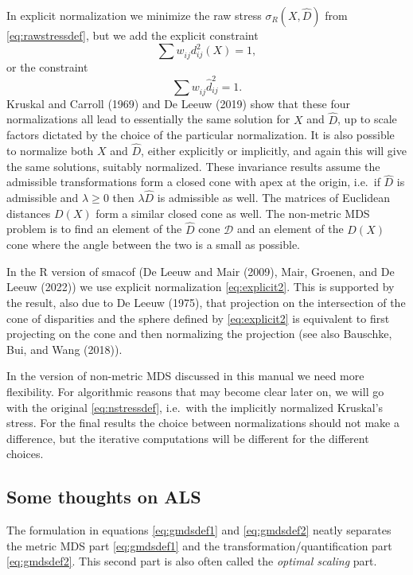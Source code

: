\documentclass[
  12pt,
]{article}
\begin{document}
In explicit normalization we minimize the raw stress \(\sigma_R(X,\hat D)\)
from \eqref{eq:rawstressdef}, but we add the explicit constraint
\begin{equation}
\sum   w_{ij}^{\ }d_{ij}^2(X)=1,
\label{eq:explicit1}
\end{equation}
or the constraint
\begin{equation}
\sum   w_{ij}^{\ }\hat d_{ij}^2=1.
\label{eq:explicit2}
\end{equation}
Kruskal and Carroll (1969) and De Leeuw (2019) show that these
four normalizations all lead to essentially the same solution for \(X\)
and \(\hat D\), up to scale factors dictated by the choice of the particular
normalization. It is also possible to normalize both \(X\) and \(\hat D\),
either explicitly or implicitly, and again this will give the same
solutions, suitably normalized. These invariance results assume the
admissible transformations form a closed cone with apex at the origin,
i.e.~if \(\hat D\) is admissible and \(\lambda\geq 0\) then \(\lambda\hat D\)
is admissible as well. The matrices of Euclidean distances \(D(X)\) form a
similar closed cone as well. The non-metric MDS problem is to find an element
of the \(\hat D\) cone \(\mathcal{D}\) and an element of the \(D(X)\) cone where the angle between the two is a small as possible.

In the R version of smacof (De Leeuw and Mair (2009),
Mair, Groenen, and De Leeuw (2022)) we use explicit normalization
\eqref{eq:explicit2}. This is supported by the result, also due to
De Leeuw (1975), that projection on the intersection of the cone of
disparities and the sphere defined by \eqref{eq:explicit2} is equivalent
to first projecting on the cone and then normalizing the projection (see
also Bauschke, Bui, and Wang (2018)).

In the version of non-metric MDS discussed in this manual we need more flexibility. For algorithmic reasons that may become clear later on, we will go with the original \eqref{eq:nstressdef}, i.e.~with the implicitly normalized
Kruskal's stress. For the final results the choice between normalizations should not make a difference, but the iterative computations will be different for the
different choices.

\subsection{Some thoughts on ALS}\label{some-thoughts-on-als}

The formulation in equations \eqref{eq:gmdsdef1} and \eqref{eq:gmdsdef2} neatly separates the
metric MDS part \eqref{eq:gmdsdef1} and the transformation/quantification part \eqref{eq:gmdsdef2}.
This second part is also often called the \emph{optimal scaling} part.
\end{document}
